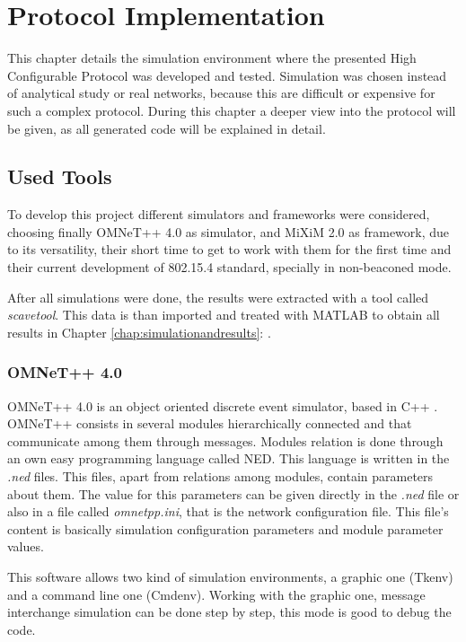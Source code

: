 \chapter{Protocol Implementation}
\label{chap:protocolimplementation}

This chapter details the simulation environment where the presented High Configurable Protocol was developed and tested. Simulation was chosen 
instead of analytical study or real networks, because this are difficult or expensive for such a complex protocol. During this chapter a 
deeper view into the protocol will be given, as all generated code will be explained in detail.

\section{Used Tools}

To develop this project different simulators and frameworks were considered, choosing finally \ac{OMNeT++} 4.0 \cite{OMNeT}
as simulator, and \ac{MiXiM} 2.0 \cite{MiXiM} as framework, due to its versatility, their short time to get to work with them for the first time and 
their current development of 802.15.4 standard, specially in non-beaconed mode.

After all simulations were done, the results were extracted with a tool called \textit{scavetool}. This data is than imported and treated with 
\ac{MATLAB} \cite{MATLAB} to obtain all results in Chapter \ref{chap:simulationandresults}: .

\subsection{\ac{OMNeT++} 4.0}

\ac{OMNeT++} 4.0 is an object oriented discrete event simulator, based in C++ \cite{cpp}. \ac{OMNeT++} consists in several modules hierarchically
connected and that communicate among them through messages. Modules relation is done through an own easy programming language called \ac{NED}.
This language is written in the \textit{.ned} files. This files, apart from relations among modules, contain parameters about them. The value for this
parameters can be given directly in the \textit{.ned} file or also in a file called \textit{omnetpp.ini}, that is the network configuration file.
This file's content is basically simulation configuration parameters and module parameter values.

This software allows two kind of simulation environments, a graphic one (Tkenv) and a command line one (Cmdenv). Working with the graphic one, 
message interchange simulation can be done step by step, this mode is good to debug the code.

